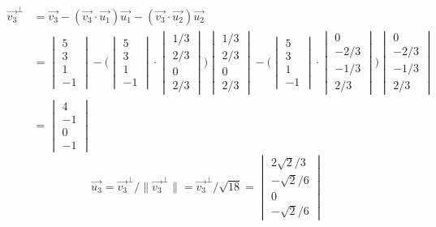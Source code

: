 \documentclass[letterpaper,12pt]{article}
\begin{document}
\begin{align*}
\vec{v_3}^{\perp} & = \vec{v_3} - (\vec{v_3} \cdot \vec{u_1}) \vec{u_1} - (\vec{v_3} \cdot \vec{u_2}) \vec{u_2}
\\ & = 
\begin{vmatrix}
5 \\
3 \\
1 \\
-1
\end{vmatrix}
- \Bigg(
\begin{vmatrix}
5 \\
3 \\
1 \\
-1
\end{vmatrix}
\cdot
\begin{vmatrix}
1/3 \\
2/3 \\
0 \\
2/3
\end{vmatrix}
\Bigg)
\begin{vmatrix}
1/3 \\
2/3 \\
0 \\
2/3
\end{vmatrix}
- \Bigg(
\begin{vmatrix}
5 \\
3 \\
1 \\
-1
\end{vmatrix}
\cdot
\begin{vmatrix}
0 \\
-2/3 \\
-1/3 \\
2/3
\end{vmatrix}
\Bigg)
\begin{vmatrix}
0 \\
-2/3 \\
-1/3 \\
2/3
\end{vmatrix}
\\ & =
\begin{vmatrix}
4 \\
-1 \\
0 \\
-1
\end{vmatrix}
\end{align*}
\begin{equation*}
\vec{u_3} = \vec{v_3}^{\perp} / \| \vec{v_3}^{\perp} \| 
=
\vec{v_3}^{\perp} / \sqrt{18}
= 
\begin{vmatrix}
2 \sqrt{2} / 3 \\
-\sqrt{2} / 6 \\
0 \\
-\sqrt{2} / 6
\end{vmatrix}
\end{equation*}
\end{document}
